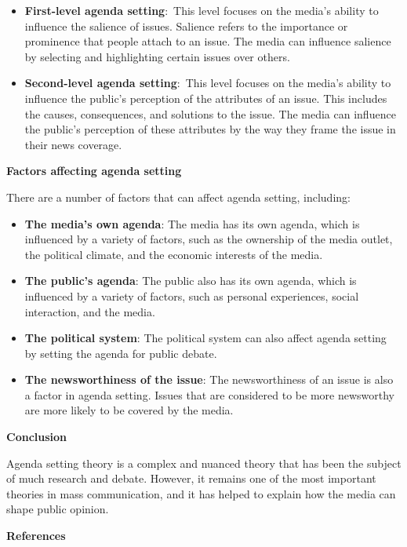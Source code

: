 \documentclass[
  b5paper]{book}
\begin{document}
\begin{itemize}
\item
  \textbf{First-level agenda setting}:~This level focuses on the media's ability to influence the salience of issues. Salience refers to the importance or prominence that people attach to an issue. The media can influence salience by selecting and highlighting certain issues over others.
\item
  \textbf{Second-level agenda setting}:~This level focuses on the media's ability to influence the public's perception of the attributes of an issue. This includes the causes, consequences, and solutions to the issue. The media can influence the public's perception of these attributes by the way they frame the issue in their news coverage.
\end{itemize}

\textbf{Factors affecting agenda setting}

There are a number of factors that can affect agenda setting, including:

\begin{itemize}
\item
  \textbf{The media's own agenda}: The media has its own agenda, which is influenced by a variety of factors, such as the ownership of the media outlet, the political climate, and the economic interests of the media.
\item
  \textbf{The public's agenda}: The public also has its own agenda, which is influenced by a variety of factors, such as personal experiences, social interaction, and the media.
\item
  \textbf{The political system}: The political system can also affect agenda setting by setting the agenda for public debate.
\item
  \textbf{The newsworthiness of the issue}: The newsworthiness of an issue is also a factor in agenda setting. Issues that are considered to be more newsworthy are more likely to be covered by the media.
\end{itemize}

\textbf{Conclusion}

Agenda setting theory is a complex and nuanced theory that has been the subject of much research and debate. However, it remains one of the most important theories in mass communication, and it has helped to explain how the media can shape public opinion.

\textbf{References}
\end{document}
